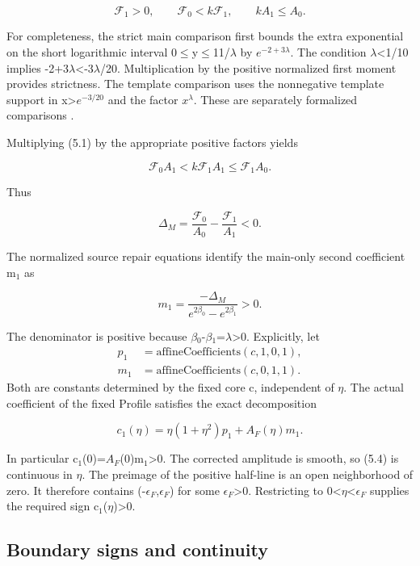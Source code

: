 \documentclass[11pt,a4paper]{article}
\begin{document}
\[
\mathcal F_1>0,\qquad \mathcal F_0<k\mathcal F_1,
\qquad kA_1\le A_0. \tag{5.1}
\]

For completeness, the strict main comparison first bounds the extra exponential on the short logarithmic interval 0\ensuremath{\le}y\ensuremath{\le}11/\ensuremath{\lambda} by \(e^{-2+3\lambda }\). The condition \ensuremath{\lambda}<1/10 implies -2+3\ensuremath{\lambda}<-3\ensuremath{\lambda}/20. Multiplication by the positive normalized first moment provides strictness. The template comparison uses the nonnegative template support in x>\(e^{-3/20}\) and the factor \(x^\lambda \). These are separately formalized comparisons \cite{ref2}.

Multiplying (5.1) by the appropriate positive factors yields

\[
\mathcal F_0A_1<k\mathcal F_1A_1\le\mathcal F_1A_0.
\]

Thus

\[
\Delta_M=\frac{\mathcal F_0}{A_0}-\frac{\mathcal F_1}{A_1}<0. \tag{5.2}
\]

The normalized source repair equations identify the main-only second coefficient m\ensuremath{{}_1} as

\[
m_1=\frac{-\Delta_M}{e^{2\beta_0}-e^{2\beta_1}}>0. \tag{5.3}
\]

The denominator is positive because \ensuremath{\beta}\ensuremath{{}_0}-\ensuremath{\beta}\ensuremath{{}_1}=\ensuremath{\lambda}>0. Explicitly, let
\[\begin{aligned}
p_1&=\mathrm{affineCoefficients}(c,1,0,1),\\
m_1&=\mathrm{affineCoefficients}(c,0,1,1).
\end{aligned}\]
Both are constants determined by the fixed core c, independent of \ensuremath{\eta}. The actual coefficient of the fixed Profile satisfies the exact decomposition

\[
c_1(\eta)=\eta(1+\eta^2)p_1+A_F(\eta)m_1. \tag{5.4}
\]

In particular c\ensuremath{{}_1}(0)=\(A_F\)(0)m\ensuremath{{}_1}>0. The corrected amplitude is smooth, so (5.4) is continuous in \ensuremath{\eta}. The preimage of the positive half-line is an open neighborhood of zero. It therefore contains (-\(\epsilon _F\),\(\epsilon _F\)) for some \(\epsilon _F\)>0. Restricting to 0<\ensuremath{\eta}<\(\epsilon _F\) supplies the required sign c\ensuremath{{}_1}(\ensuremath{\eta})>0.

\subsection{Boundary signs and continuity}
\end{document}

